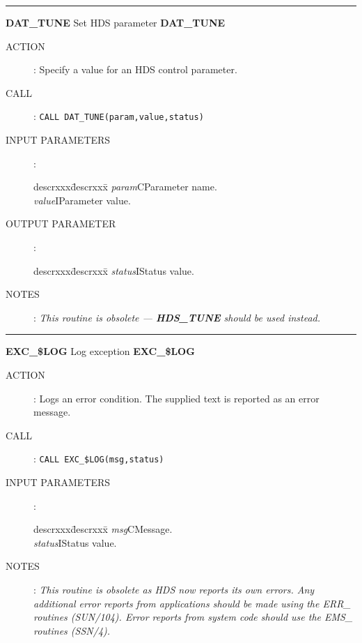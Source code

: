 \rule{\textwidth}{0.3mm}
{\Large {\bf DAT\_TUNE} \hfill Set HDS parameter \hfill {\bf DAT\_TUNE}}
\begin{description}
\item [ACTION]:
Specify a value for an HDS control parameter.
\item [CALL]:
{\tt CALL DAT\_TUNE(param,value,status)}
\item [INPUT PARAMETERS]:
\begin{tabbing}
descrxxx\=descrxxx\=\kill
{\em param}\>C\>Parameter name.\\
{\em value}\>I\>Parameter value.
\end{tabbing}
\item [OUTPUT PARAMETER]:
\begin{tabbing}
descrxxx\=descrxxx\=\kill
{\em status}\>I\>Status value.
\end{tabbing}
\item [NOTES]:
{\em This routine is obsolete --- {\bf HDS\_TUNE} should be used instead.}
\end{description}
\goodbreak

\rule{\textwidth}{0.3mm}
{\Large {\bf EXC\_\$LOG} \hfill Log exception \hfill {\bf EXC\_\$LOG}}
\begin{description}
\item [ACTION]:
Logs an error condition.
The supplied text is reported as an error message.
\item [CALL]:
{\tt CALL EXC\_\$LOG(msg,status)}
\item [INPUT PARAMETERS]:
\begin{tabbing}
descrxxx\=descrxxx\=\kill
{\em msg}\>C\>Message.\\
{\em status}\>I\>Status value.
\end{tabbing}
\item[NOTES]:
{\em This routine is obsolete as HDS now reports its own errors. Any additional
error reports from applications should be made using the ERR\_ routines
(SUN/104). Error reports from system code should use the EMS\_ routines
(SSN/4).}
\end{description}
\goodbreak

